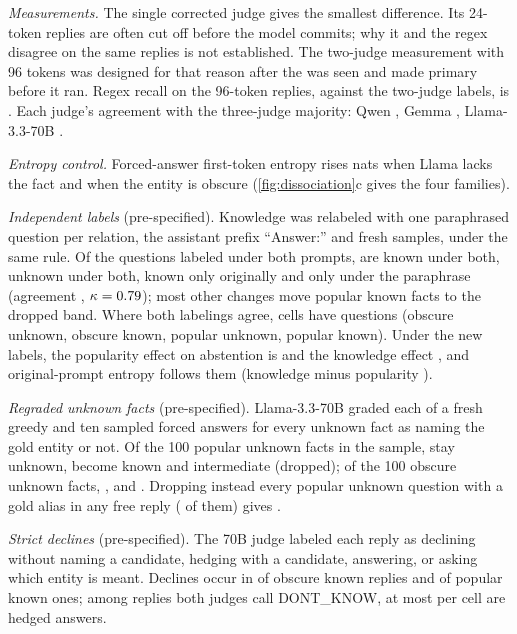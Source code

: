 \documentclass{article}
\begin{document}
\emph{Measurements.} The single corrected judge gives the smallest difference. Its 24-token replies are often cut off before the model commits; why it and the regex disagree on the same replies is not established. The two-judge measurement with 96 tokens was designed for that reason after the \hjLlamaDiff{} was seen and made primary before it ran. Regex recall on the 96-token replies, against the two-judge labels, is \hmLlamaRegexRecall. Each judge's agreement with the three-judge majority: Qwen \lkMajQwen, Gemma \lkMajGemma, Llama-3.3-70B \lkMajLlama.

\emph{Entropy control.} Forced-answer first-token entropy rises \entLlamaKnow{} nats when Llama lacks the fact and \entLlamaPop{} when the entity is obscure (\cref{fig:dissociation}c gives the four families).

\emph{Independent labels} (pre-specified). Knowledge was relabeled with one paraphrased question per relation, the assistant prefix ``Answer:'' and fresh samples, under the same rule. Of the \lcBothN{} questions labeled under both prompts, \lcKK{} are known under both, \lcUU{} unknown under both, \lcKU{} known only originally and \lcUK{} only under the paraphrase (agreement \lcAgree, $\kappa=0.79$); most other changes move popular known facts to the dropped band. Where both labelings agree, cells have \lcConsN{} questions (obscure unknown, obscure known, popular unknown, popular known). Under the new labels, the popularity effect on abstention is \eoPop{} \eoPopCI{} and the knowledge effect \eoKnow{} \eoKnowCI, and original-prompt entropy follows them (knowledge minus popularity \eoEntKmP{} \eoEntKmPCI).

\emph{Regraded unknown facts} (pre-specified). Llama-3.3-70B graded each of a fresh greedy and ten sampled forced answers for every unknown fact as naming the gold entity or not. Of the 100 popular unknown facts in the sample, \sePUStay{} stay unknown, \sePUKnown{} become known and \sePUInter{} intermediate (dropped); of the 100 obscure unknown facts, \seOUStay{}, \seOUKnown{} and \seOUInter. Dropping instead every popular unknown question with a gold alias in any free reply (\lcPUAlias{} of them) gives \lcAliasDrop{} \lcAliasDropCI.

\emph{Strict declines} (pre-specified). The 70B judge labeled each reply as declining without naming a candidate, hedging with a candidate, answering, or asking which entity is meant. Declines occur in \sdObsKnown{} of obscure known replies and \sdPopKnown{} of popular known ones; among replies both judges call DONT\_KNOW, at most \sdHedgedMax{} per cell are hedged answers.
\end{document}
